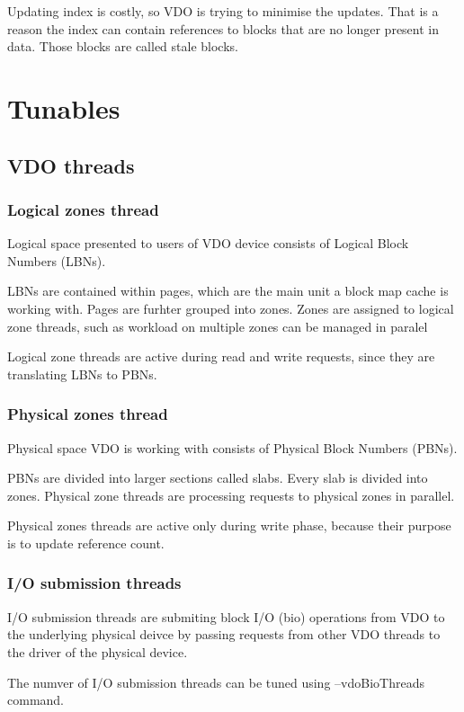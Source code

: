 \documentclass[
  color, %
  table, %
  lof,   %
  lot,   %
]{fithesis3}
\begin{document}
Updating index is costly, so VDO is trying to minimise the updates. That is a reason the index can contain references to blocks that are no longer present in data. Those blocks are called stale blocks.


\section{Tunables}


\subsection{VDO threads}
\subsubsection{Logical zones thread}
Logical space presented to users of VDO device consists of Logical Block Numbers (LBNs).

LBNs are contained within pages, which are the main unit a block map cache is working with. Pages are furhter grouped into zones. Zones are assigned to logical zone threads, such as workload on multiple zones can be managed in paralel

Logical zone threads are active during read and write requests, since they are translating LBNs to PBNs.

\subsubsection{Physical zones thread}
Physical space VDO is working with consists of Physical Block Numbers (PBNs).

PBNs are divided into larger sections called slabs. Every slab is divided into zones. Physical zone threads are processing requests to physical zones in parallel.

Physical zones threads are active only during write phase, because their purpose is to update reference count.


\subsubsection{I/O submission threads}
I/O submission threads are submiting block I/O (bio) operations from VDO to the underlying physical deivce by passing requests from other VDO threads to the driver of the physical device. 

The numver of I/O submission threads can be tuned using --vdoBioThreads command.
\end{document}
